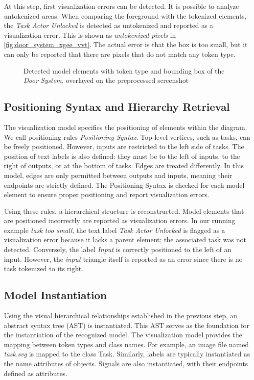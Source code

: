 At this step, first visualization errors can be detected. It is possible to analyze untokenized areas. When comparing the foreground with the tokenized elements, the \emph{Task Actor Unlocked} is detected as untokenized and reported as a visualization error. This is shown as \emph{untokenized pixels} in \autoref{fig:door_system_xgee_vvt}. The actual error is that the box is too small, but it can only be reported that there are pixels that do not match any token type.

\begin{figure}[htb]
  \centering
  \caption{Detected model elements with token type and bounding box of the \emph{Door System}, overlayed on the preprocessed screenshot}
  
  \label{fig:detected_model_elements}
\end{figure}

\subsection{Positioning Syntax and Hierarchy Retrieval}
The visualization model specifies the positioning of elements within the diagram. We call positioning rules \emph{Positioning Syntax}. Top-level vertices, such as tasks, can be freely positioned. However, inputs are restricted to the left side of tasks. The position of text labels is also defined: they must be to the left of inputs, to the right of outputs, or at the bottom of tasks. 
Edges are treated differently. In this model, edges are only permitted between outputs and inputs, meaning their endpoints are strictly defined. The Positioning Syntax is checked for each model element to ensure proper positioning and report visualization errors. 

Using these rules, a hierarchical structure is reconstructed. Model elements that are positioned incorrectly are reported as visualization errors. In our running example \emph{task too small}, the text label \emph{Task Actor Unlocked} is flagged as a visualization error because it lacks a parent element; the associated task was not detected. Conversely, the label \emph{Input} is correctly positioned to the left of an input. However, the \emph{input} triangle itself is reported as an error since there is no task tokenized to its right.


\subsection{Model Instantiation}
Using the visual hierarchical relationships established in the previous step, an abstract syntax tree (AST) is instantiated. This AST serves as the foundation for the instantiation of the recognized model. The visualization model provides the mapping between token types and class names.
For example, an image file named \emph{task.svg} is mapped to the class Task. Similarly, labels are typically instantiated as the name attributes of objects. Signals are also instantiated, with their endpoints defined as attributes.

